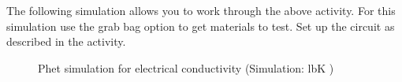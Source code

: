 \label{m38706*eip-316}The following simulation allows you to work through the above activity. For this simulation use the grab bag option to get materials to test. Set up the circuit as described in the activity.
    \setcounter{subfigure}{0}
	\begin{figure}[H] %
    \textnormal{Phet simulation for electrical conductivity}\vspace{.1in} \nopagebreak
  \label{m38806*phet!!!underscore!!!sim}\label{m38806*phet-simulation}
             { (Simulation:  lbK )}
      \vspace{2pt}
    \vspace{.1in}
 \end{figure}    
        \par 
    \label{m38706*cid7}
